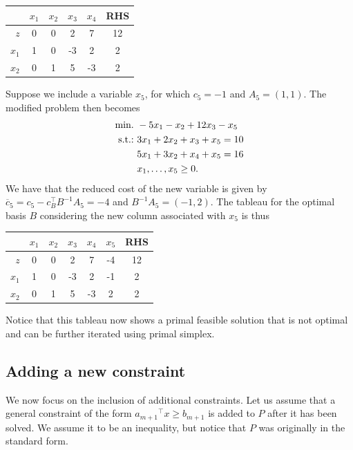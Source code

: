 \begin{center}
	\begin{tabular}{r|cccc|c} 
	   &$x_1$ & $x_2$ & $x_3$ & $x_4$& RHS \\ \hline	
	   $z$ & 0 & 0 & 2 & 7 & 12\\ \hline
	   $x_1$ & 1 & 0 & -3 & 2 & 2\\
	   $x_2$ & 0 & 1 & 5 & -3 & 2            
	\end{tabular}
\end{center}

Suppose we include a variable $x_5$, for which $c_5 = -1$ and $A_5 = (1,1)$. The modified problem then becomes
%
\begin{align*}
	\mathop{\text{min.~}} & -5x_1 -x_2 + 12 x_3 -x_5 	 \\
	\mathop{\text{s.t.:~}}   & 3x_1 + 2x_2 + x_3 + x_5 = 10 \\
	& 5x_1 + 3x_2 + x_4 + x_5 = 16 \\
	& x_1, \dots, x_5 \geq 0.
\end{align*}
%
We have that the reduced cost of the new variable is given by $\overline{c}_5 = c_5 - c_B^\top B^{-1}A_5 = -4$ and $B^{-1}A_5 = (-1,2)$. The tableau for the optimal basis $B$ considering the new column associated with $x_5$ is thus

\begin{center}
	\begin{tabular}{r|ccccc|c} 
	   &$x_1$ & $x_2$ & $x_3$ & $x_4$& $x_5$ & RHS \\ \hline	
	   $z$ & 0 & 0 & 2 & 7 & -4 & 12   \\ \hline
	   $x_1$ & 1 & 0 & -3 & 2 & -1 & 2 \\
	   $x_2$ & 0 & 1 & 5 & -3 & 2 & 2	            
	\end{tabular}
\end{center}

Notice that this tableau now shows a primal feasible solution that is not optimal and can be further iterated using primal simplex.


\subsection{Adding a new constraint} \label{section_612}

We now focus on the inclusion of additional constraints. Let us assume that a general constraint of the form ${a_{m+1}}^\top x \geq b_{m+1}$ is added to $P$ after it has been solved. We assume it to be an inequality, but notice that $P$ was originally in the standard form.

